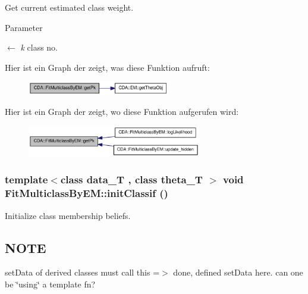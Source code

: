 Get current estimated class weight. 


\begin{DoxyParams}{Parameter}
\item[\mbox{$\leftarrow$} {\em k}]class no. \end{DoxyParams}


Hier ist ein Graph der zeigt, was diese Funktion aufruft:\nopagebreak
\begin{figure}[H]
\begin{center}
\leavevmode
\includegraphics[width=176pt]{classCDA_1_1FitMulticlassByEM_a869530b76ee4b40d38d3fb80ea0932aa_cgraph}
\end{center}
\end{figure}




Hier ist ein Graph der zeigt, wo diese Funktion aufgerufen wird:\nopagebreak
\begin{figure}[H]
\begin{center}
\leavevmode
\includegraphics[width=215pt]{classCDA_1_1FitMulticlassByEM_a869530b76ee4b40d38d3fb80ea0932aa_icgraph}
\end{center}
\end{figure}


\hypertarget{classCDA_1_1FitMulticlassByEM_aceb43b0a386c8f8e112562cc3288b23d}{
\subsubsection[{initClassif}]{\setlength{\rightskip}{0pt plus 5cm}template$<$class data\_\-T , class theta\_\-T $>$ void FitMulticlassByEM::initClassif ()}}
\label{classCDA_1_1FitMulticlassByEM_aceb43b0a386c8f8e112562cc3288b23d}


Initialize class membership beliefs. 

\hypertarget{GaussianMixtureModel1D_8h_09_09_NOTE}{}\subsection{NOTE}\label{GaussianMixtureModel1D_8h_09_09_NOTE}
setData of derived classes must call this =$>$ done, defined setData here. can one be \char`\"{}using\char`\"{} a template fn? 

